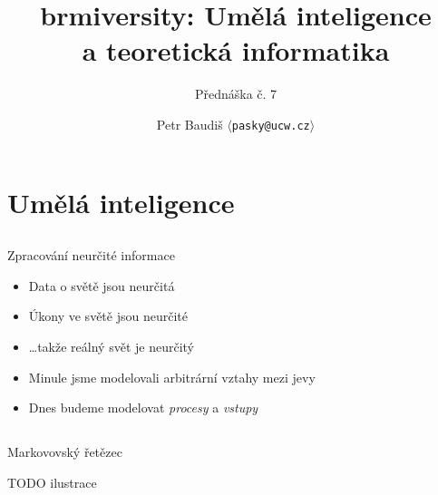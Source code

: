 \documentclass{beamer}
\begin{document}

\title{brmiversity: Umělá inteligence \\ a teoretická informatika}
\subtitle{Přednáška č. 7}
\author{Petr Baudiš $\langle${\tt pasky@ucw.cz}$\rangle$}
\date{}
\frame{\titlepage}

\section{Umělá inteligence}

\subsection{}
\begin{frame}{Zpracování neurčité informace}
\begin{itemize}
\item Data o světě jsou neurčitá
\item Úkony ve světě jsou neurčité
\item \dots takže reálný svět je neurčitý
\item Minule jsme modelovali arbitrární vztahy mezi jevy
\item Dnes budeme modelovat {\em procesy} a {\em vstupy}
\end{itemize}
\end{frame}

\subsection{}
\begin{frame}{Markovovský řetězec}

TODO ilustrace
\end{frame}
\end{document}
